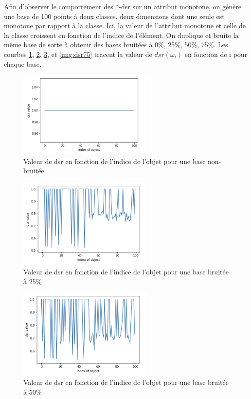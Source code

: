 \documentclass[a4paper]{article}
\begin{document}
Afin d'observer le comportement des *-dsr sur un attribut monotone, on génère
une base de 100 points à deux classes, deux dimensions dont une seule est
monotone par rapport à la classe.  Ici, la valeur de l'attribut monotone et
celle de la classe croissent en fonction de l'indice de l'élément. On duplique
et bruite la même base de sorte à obtenir des bases bruitées à 0\%, 25\%, 50\%,
75\%.  Les courbes \ref{img:dsr0}, \ref{img:dsr25}, \ref{img:dsr50}, et
\ref{img:dsr75} tracent la valeur de $dsr(\omega_i)$ en fonction de i pour
chaque base. \\

\begin{figure}[H]
	\center 
	\includegraphics[width=0.6\textwidth]{images/dsr_0.png}
    \caption{Valeur de dsr en fonction de l'indice de l'objet pour une base
    non-bruitée}
    \label{img:dsr0}
\end{figure}

\begin{figure}[H]
	\center 
	\includegraphics[width=0.6\textwidth]{images/dsr_25.png}
    \caption{Valeur de dsr en fonction de l'indice de l'objet pour une base
    bruitée à 25\%}
    \label{img:dsr25}
\end{figure}

\begin{figure}[H]
	\center 
	\includegraphics[width=0.6\textwidth]{images/dsr_50.png}
    \caption{Valeur de dsr en fonction de l'indice de l'objet pour une base
    bruitée à 50\%}
    \label{img:dsr50}
\end{figure}
\end{document}
